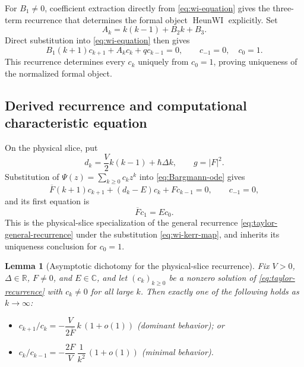 \documentclass[11pt]{article}
\newtheorem{lemma}[theorem]{Lemma}
\theoremstyle{remark}
\begin{document}
For \(B_1\ne0\), coefficient extraction directly from \eqref{eq:wi-equation}
gives the three-term recurrence that determines the formal object
\(\operatorname{HeunWI}\) explicitly.  Set
\begin{equation}
 A_k=k(k-1)+B_2k+B_3.
 \label{eq:taylor-Ak}
\end{equation}
Direct substitution into \eqref{eq:wi-equation} then gives
\begin{equation}
 B_1(k+1)c_{k+1}+A_kc_k+qc_{k-1}=0,\qquad
 c_{-1}=0,\quad c_0=1.
 \label{eq:taylor-general-recurrence}
\end{equation}
This recurrence determines every \(c_k\) uniquely from \(c_0=1\), proving
uniqueness of the normalized formal object.

\subsection{Derived recurrence and computational characteristic equation}

On the physical slice, put
\begin{equation}
 d_k=\frac V2k(k-1)+\hbar\Delta k,\qquad g=|F|^2.
 \label{eq:dk-g}
\end{equation}
Substitution of \(\Psi(z)=\sum_{k\ge0}c_kz^k\) into
\eqref{eq:Bargmann-ode} gives
\begin{equation}
 \overline F(k+1)c_{k+1}+(d_k-E)c_k+Fc_{k-1}=0,
 \qquad c_{-1}=0,
 \label{eq:taylor-recurrence}
\end{equation}
and its first equation is
\begin{equation}
 \overline F c_1=Ec_0.
 \label{eq:origin-compatibility}
\end{equation}
This is the physical-slice specialization of the general recurrence
\eqref{eq:taylor-general-recurrence} under the substitution
\eqref{eq:wi-kerr-map}, and inherits its uniqueness conclusion for
\(c_0=1\).

\begin{lemma}[Asymptotic dichotomy for the physical-slice recurrence]
\label{lem:asymptotic-dichotomy}
Fix \(V>0\), \(\Delta\in\mathbb R\), \(F\ne0\), and \(E\in\mathbb C\), and
let \((c_k)_{k\ge0}\) be a nonzero solution of \eqref{eq:taylor-recurrence}
with \(c_k\ne0\) for all large \(k\).  Then exactly one of the following
holds as \(k\to\infty\):
\begin{itemize}
\item[(a)] \(c_{k+1}/c_k=-\dfrac{V}{2\overline F}\,k\,(1+o(1))\)
 (\emph{dominant} behavior); or
\item[(b)] \(c_k/c_{k-1}=-\dfrac{2F}{V}\,\dfrac1{k^2}\,(1+o(1))\)
 (\emph{minimal} behavior).
\end{itemize}
\end{lemma}
\end{document}
